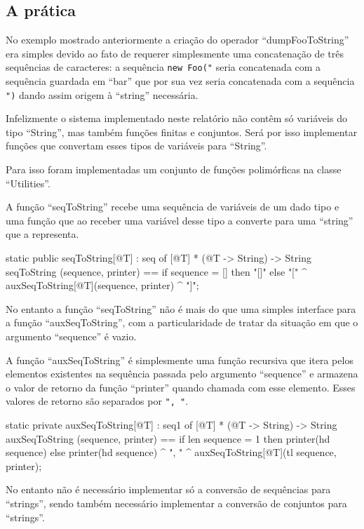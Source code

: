 \subsection{A prática}

No exemplo mostrado anteriormente a criação do operador
``dumpFooToString'' era simples devido ao fato de requerer
simplesmente uma concatenação de três sequências de caracteres: a
sequência \texttt{new Foo("} seria concatenada com a sequência
guardada em ``bar'' que por sua vez seria concatenada com a sequência
\texttt{")} dando assim origem à ``string'' necessária.

Infelizmente o sistema implementado neste relatório não contêm só
variáveis do tipo ``String'', mas também funções finitas e
conjuntos. Será por isso implementar funções que convertam esses tipos
de variáveis para ``String''.

Para isso foram implementadas um conjunto de funções polimórficas na
classe ``Utilities''.

A função ``seqToString'' recebe uma sequência de variáveis de um dado
tipo e uma função que ao receber uma variável desse tipo a converte
para uma ``string'' que a representa.

\begin{vdm_al}
  static public seqToString[@T] : seq of [@T] * (@T -> String) -> String
  seqToString (sequence, printer) ==
    if sequence = [] then "[]"
    else "[" ^ auxSeqToString[@T](sequence, printer) ^ "]";
\end{vdm_al}

No entanto a função ``seqToString'' não é mais do que uma simples
interface para a função ``auxSeqToString'', com a particularidade de
tratar da situação em que o argumento ``sequence'' é vazio.

A função ``auxSeqToString'' é simplesmente uma função recursiva que
itera pelos elementos existentes na sequência passada pelo argumento
``sequence'' e armazena o valor de retorno da função ``printer''
quando chamada com esse elemento. Esses valores de retorno são
separados por \texttt{", "}.

\begin{vdm_al}
  static private auxSeqToString[@T] : seq1 of [@T] * (@T -> String) -> String
  auxSeqToString (sequence, printer) ==
    if len sequence = 1 then
      printer(hd sequence)
    else
      printer(hd sequence) ^ ", " ^ auxSeqToString[@T](tl sequence, printer);
\end{vdm_al}

No entanto não é necessário implementar só a conversão de sequências
para ``strings'', sendo também necessário implementar a conversão de
conjuntos para ``strings''.

